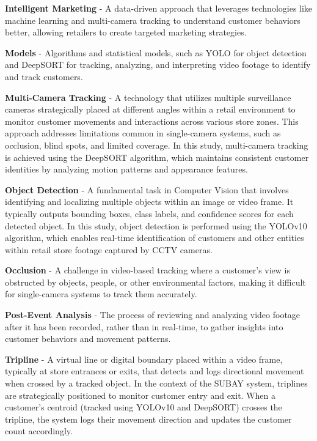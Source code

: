 {\textbf{Intelligent Marketing} - A data-driven approach that leverages technologies like machine learning and multi-camera tracking to understand customer behaviors better, allowing retailers to create targeted marketing strategies.

\textbf{Models} - Algorithms and statistical models, such as YOLO for object detection and DeepSORT for tracking, analyzing, and interpreting video footage to identify and track customers.

\textbf{Multi-Camera Tracking} - A technology that utilizes multiple surveillance cameras strategically placed at different angles within a retail environment to monitor customer movements and interactions across various store zones. This approach addresses limitations common in single-camera systems, such as occlusion, blind spots, and limited coverage. In this study, multi-camera tracking is achieved using the DeepSORT algorithm, which maintains consistent customer identities by analyzing motion patterns and appearance features.

\textbf{Object Detection} - A fundamental task in Computer Vision that involves identifying and localizing multiple objects within an image or video frame. It typically outputs bounding boxes, class labels, and confidence scores for each detected object. In this study, object detection is performed using the YOLOv10 algorithm, which enables real-time identification of customers and other entities within retail store footage captured by CCTV cameras.

\textbf{Occlusion} - A challenge in video-based tracking where a customer’s view is obstructed by objects, people, or other environmental factors, making it difficult for single-camera systems to track them accurately.

\textbf{Post-Event Analysis} - The process of reviewing and analyzing video footage after it has been recorded, rather than in real-time, to gather insights into customer behaviors and movement patterns.

\textbf{Tripline} - A virtual line or digital boundary placed within a video frame, typically at store entrances or exits, that detects and logs directional movement when crossed by a tracked object. In the context of the SUBAY system, triplines are strategically positioned to monitor customer entry and exit. When a customer's centroid (tracked using YOLOv10 and DeepSORT) crosses the tripline, the system logs their movement direction and updates the customer count accordingly.

}
